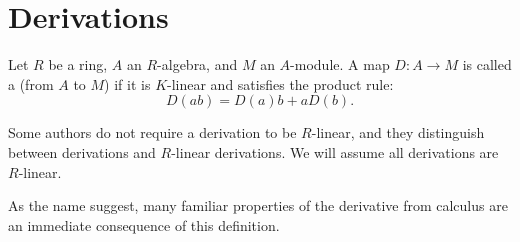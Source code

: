
\section{Derivations}
\label{chap_differentials}

\begin{definition}
  Let $R$ be a ring, $A$ an $R$-algebra, and $M$ an $A$-module.
  A map $D : A \to M$ is called a  (from $A$ to $M$) if it is $K$-linear and satisfies the product rule:
    \[ D(ab) = D(a)b + aD(b). \]
\end{definition}

Some authors do not require a derivation to be $R$-linear,
and they distinguish between derivations and $R$-linear derivations.
We will assume all derivations are $R$-linear.

As the name suggest, many familiar properties of the derivative from calculus are an immediate consequence of this definition.

